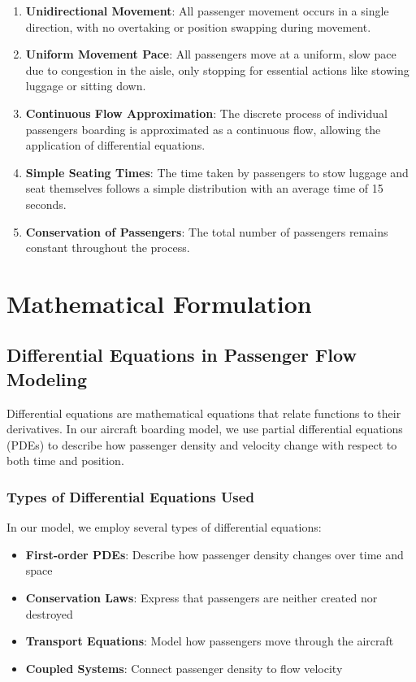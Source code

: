 \documentclass[a4paper,12pt]{article}
\begin{document}
\begin{enumerate}
    \item \textbf{Unidirectional Movement}: All passenger movement occurs in a single direction, with no overtaking or position swapping during movement.

    \item \textbf{Uniform Movement Pace}: All passengers move at a uniform, slow pace due to congestion in the aisle, only stopping for essential actions like stowing luggage or sitting down.

    \item \textbf{Continuous Flow Approximation}: The discrete process of individual passengers boarding is approximated as a continuous flow, allowing the application of differential equations.

    \item \textbf{Simple Seating Times}: The time taken by passengers to stow luggage and seat themselves follows a simple distribution with an average time of 15 seconds.

    \item \textbf{Conservation of Passengers}: The total number of passengers remains constant throughout the process.
\end{enumerate}

\section{Mathematical Formulation}

\subsection{Differential Equations in Passenger Flow Modeling}

Differential equations are mathematical equations that relate functions to their derivatives. In our aircraft boarding model, we use partial differential equations (PDEs) to describe how passenger density and velocity change with respect to both time and position.

\subsubsection{Types of Differential Equations Used}

In our model, we employ several types of differential equations:

\begin{itemize}
    \item \textbf{First-order PDEs}: Describe how passenger density changes over time and space
    \item \textbf{Conservation Laws}: Express that passengers are neither created nor destroyed
    \item \textbf{Transport Equations}: Model how passengers move through the aircraft
    \item \textbf{Coupled Systems}: Connect passenger density to flow velocity
\end{itemize}
\end{document}
